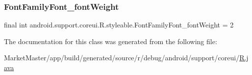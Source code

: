 \subsubsection{\texorpdfstring{Font\+Family\+Font\+\_\+font\+Weight}{FontFamilyFont\_fontWeight}}
{\footnotesize\ttfamily final int android.\+support.\+coreui.\+R.\+styleable.\+Font\+Family\+Font\+\_\+font\+Weight = 2\hspace{0.3cm}{\ttfamily [static]}}



The documentation for this class was generated from the following file\+:\begin{DoxyCompactItemize}
\item 
Market\+Master/app/build/generated/source/r/debug/android/support/coreui/\mbox{\hyperlink{debug_2android_2support_2coreui_2R_8java}{R.\+java}}\end{DoxyCompactItemize}

